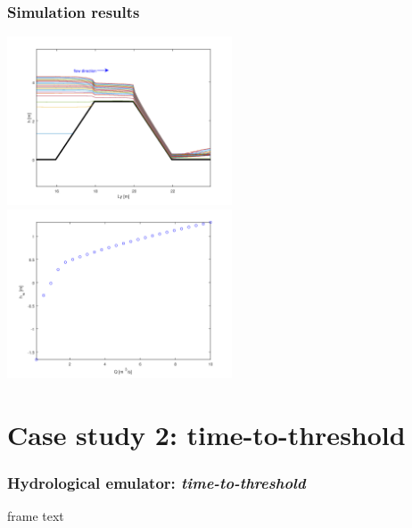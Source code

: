 \documentclass[xcolor=dvipsnames, USenglish]{beamer}  %
\begin{document}
  \begin{frame}
    \frametitle{Simulation results}
    \includegraphics[width=0.5\textwidth]{img/free_surfaces.png}
    \includegraphics[width=0.5\textwidth]{img/simulation_results.png}
  \end{frame}






\section{Case study 2: time-to-threshold}

  \begin{frame}
    \frametitle{Hydrological emulator: \emph{time-to-threshold}}
    frame text
  \end{frame}
\end{document}
